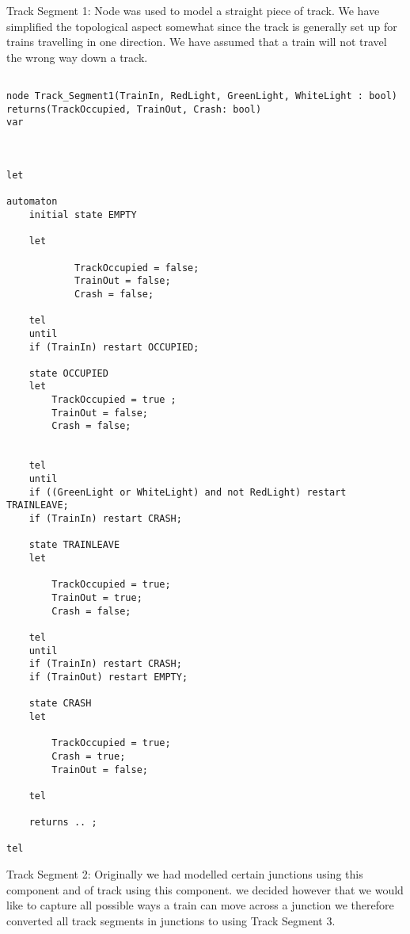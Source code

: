  Track Segment 1:
 Node was used to model a straight piece of track. We have simplified the
 topological aspect somewhat
 since the track is generally set up for trains travelling in one direction. We
 have assumed that a train will not travel the wrong way down a track.

\begin{verbatim}

node Track_Segment1(TrainIn, RedLight, GreenLight, WhiteLight : bool)
returns(TrackOccupied, TrainOut, Crash: bool)
var



let

automaton
	initial state EMPTY

	let
	
			TrackOccupied = false; 
			TrainOut = false; 
			Crash = false;
	
	tel
	until
	if (TrainIn) restart OCCUPIED;
	
	state OCCUPIED
	let
		TrackOccupied = true ;
		TrainOut = false;
		Crash = false;
	 
	
	tel
	until
	if ((GreenLight or WhiteLight) and not RedLight) restart TRAINLEAVE;
	if (TrainIn) restart CRASH;
	
	state TRAINLEAVE
	let
	
		TrackOccupied = true;
		TrainOut = true;
		Crash = false;
	
	tel
	until
	if (TrainIn) restart CRASH;
	if (TrainOut) restart EMPTY;
	
	state CRASH
	let
	
		TrackOccupied = true;
		Crash = true;
		TrainOut = false;
	
	tel
	
	returns .. ;

tel

\end{verbatim}

 Track Segment 2:
 Originally we had modelled certain junctions using this component and
 of track using this component. 
 we decided however that we would like to capture all possible ways a train can move across a junction
 we therefore converted all track segments in junctions to using Track Segment 3.

